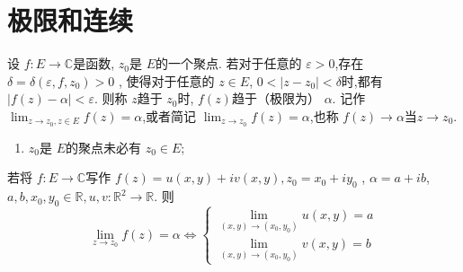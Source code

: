 \documentclass[../../复变函数.tex]{subfiles}
\begin{document}
\hspace*{\fill} 

\section{极限和连续}

\begin{definition}
    设 \(  f: E\to \mathbb{C}   \)是函数, \(  z_0  \)是 \(  E  \)的一个聚点.   
    若对于任意的 \(  \varepsilon >0  \),存在 \(   \delta     =   \delta  \left( \varepsilon ,f,z_0 \right)>0 \)  ,
    使得对于任意的 \(  z \in E  \), \(  0<\left| z-z_0 \right|<  \delta     \)时,都有 \(  \left| f\left( z \right)-\alpha   \right|<\varepsilon    \).
    则称 \(  z  \)趋于 \(  z_0  \)时, \(  f\left( z \right)   \)趋于（极限为） \(  \alpha   \).       
    记作 \(  \lim_{z\to z_0,z \in E}f\left( z \right)=  \alpha    \),或者简记 \(  \lim_{z\to z_0}f\left( z \right)= \alpha    \),也称 \(  f\left( z \right)\to \alpha  \text{当}z\to z_0   \).   
\end{definition}

\begin{remark}
    \begin{enumerate}
        \item \(  z_0  \)是 \(  E  \)的聚点未必有 \(  z_0 \in E  \);   
    \end{enumerate}
    
\end{remark}

\begin{proposition}
    若将 \(  f: E\to \mathbb{C}   \)写作 \(  f\left( z \right)=  u\left( x,y \right)+  i v\left( x,y \right)    ,z_0= x_0+ iy_0 \)  , \(  \alpha  =  a+ ib  \), \(  a,b ,x_0,y_0\in \mathbb{R} ,u,v : \mathbb{R} ^{2}  \to \mathbb{R} \).
    则   \[
    \lim_{z\to z_0}f\left( z \right) =  \alpha \iff  \begin{cases} \lim_{\left( x,y \right)\to \left( x_0,y_0 \right) }u\left( x,y \right)= a\\ 
     \lim_{\left( x,y \right)\to \left( x_0,y_0 \right)  }v\left( x,y \right)= b\end{cases}  
    \]
\end{proposition}
\end{document}
